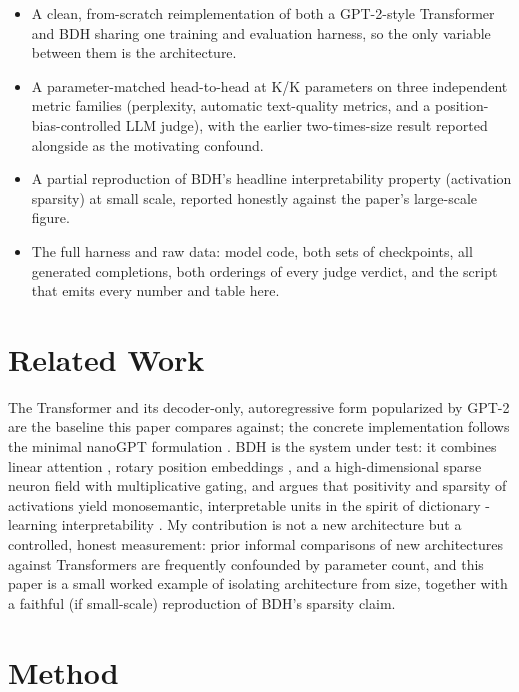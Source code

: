\documentclass[11pt]{article}
\begin{document}
\begin{itemize}
\item A clean, from-scratch reimplementation of both a GPT-2-style Transformer
  and BDH sharing one training and evaluation harness, so the only variable
  between them is the architecture.
\item A parameter-matched head-to-head at \GptParamsK{}K/\BdhParamsK{}K
  parameters on three independent metric families (perplexity, automatic
  text-quality metrics, and a position-bias-controlled LLM judge), with the
  earlier two-times-size result reported alongside as the motivating confound.
\item A partial reproduction of BDH's headline interpretability property
  (activation sparsity) at small scale, reported honestly against the paper's
  large-scale figure.
\item The full harness and raw data: model code, both sets of checkpoints, all
  generated completions, both orderings of every judge verdict, and the script
  that emits every number and table here.
\end{itemize}

\section{Related Work}

The Transformer \cite{vaswani2017attention} and its decoder-only, autoregressive
form popularized by GPT-2 \cite{radford2019gpt2} are the baseline this paper
compares against; the concrete implementation follows the minimal nanoGPT
formulation \cite{karpathy2022nanogpt}. BDH \cite{kosowski2025bdh} is the system
under test: it combines linear attention \cite{katharopoulos2020linear}, rotary
position embeddings \cite{su2021roformer}, and a high-dimensional sparse neuron
field with multiplicative gating, and argues that positivity and sparsity of
activations yield monosemantic, interpretable units in the spirit of dictionary
-learning interpretability \cite{bricken2023monosemanticity}. My contribution is
not a new architecture but a controlled, honest measurement: prior informal
comparisons of new architectures against Transformers are frequently confounded
by parameter count, and this paper is a small worked example of isolating
architecture from size, together with a faithful (if small-scale) reproduction
of BDH's sparsity claim.

\section{Method}
\label{sec:method}
\end{document}
